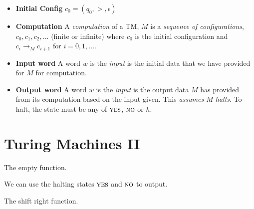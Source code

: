 \frmrule


\begin{itemize}   
\renewcommand{\labelitemi}{$\Box$}
\item \textbf{Initial Config} $c_0 = (q_0,>,\epsilon)$
%
\item \textbf{Computation} 
A \textit{computation} of a TM, $M$ is a \textit{sequence of
conﬁgurations}, $c_0, c_1, c_2,...$ (finite or infinite) 
where $c_0$ is the initial configuration and 
$c_{i} \rightarrow_M c_{i+1}$ for $i=0,1,...$.
\end{itemize}


\frmrule


\begin{itemize}   
\renewcommand{\labelitemi}{$\Box$}
\item \textbf{Input word} A word $w$ is the \textit{input} 
is the initial data that we have
provided for $M$ for computation. 
\item \textbf{Output word} A word $w$ is the \textit{input} 
is the output data $M$ has provided from its computation 
based on the input given. This \textit{assumes $M$ halts}.
To halt, the state must be any of $\textsc{yes}$, $\textsc{no}$
or $h$. 
\end{itemize} 



\section{Turing Machines II}

\begin{example}
The empty function. 

We can use the halting states $\textsc{yes}$ and
$\textsc{no}$ to output.
\end{example}

\frmrule

\begin{example}
The shift right function. 



\end{example}

